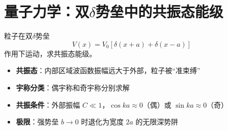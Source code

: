 \section{量子力学：双$\delta$势垒中的共振态能级}
\label{sec:double-delta-resonance}

\begin{modelbox}
粒子在双$\delta$势垒
\[
V(x)=V_0[\delta(x+a)+\delta(x-a)]
\]
作用下运动，求共振态能级。
\end{modelbox}

\begin{tipbox}[考点快速分析]
\begin{itemize}
    \item \textbf{共振态}：内部区域波函数振幅远大于外部，粒子被``准束缚''
    \item \textbf{宇称分类}：偶宇称和奇宇称分别求解
    \item \textbf{共振条件}：外部振幅 $C\ll1$，$\cos ka\approx0$（偶）或 $\sin ka\approx0$（奇）
    \item \textbf{极限}：强势垒 $b\to0$ 时退化为宽度 $2a$ 的无限深势阱
\end{itemize}
\end{tipbox}

